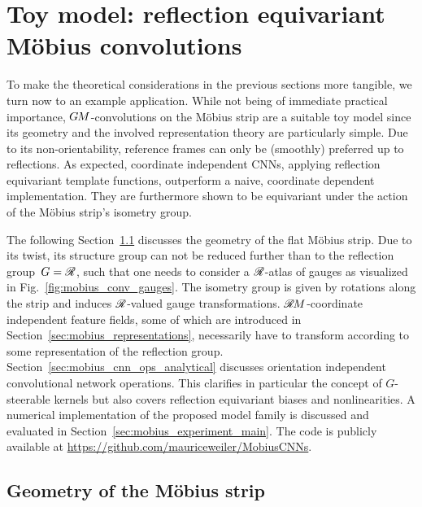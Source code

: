 

\section{Toy model: reflection equivariant M{\"o}bius convolutions}
\label{sec:mobius_conv}

To make the theoretical considerations in the previous sections more tangible, we turn now to an example application.
While not being of immediate practical importance, $G\mkern-1.4muM$-convolutions on the M\"obius strip are a suitable toy model since its geometry and the involved representation theory are particularly simple.
Due to its non-orientability, reference frames can only be (smoothly) preferred up to reflections.
As expected, coordinate independent CNNs, applying reflection equivariant template functions, outperform a naive, coordinate dependent implementation.
They are furthermore shown to be equivariant under the action of the M\"obius strip's isometry group.

\etocsettocstyle{}{} %
\localtableofcontents

The following Section~\ref{sec:mobius_geometry} discusses the geometry of the flat M\"obius strip.
Due to its twist, its structure group can not be reduced further than to the reflection group~$G=\mathscr{R}$, such that one needs to consider a $\mathscr{R}$-atlas of gauges as visualized in Fig.~\ref{fig:mobius_conv_gauges}.
The isometry group is given by rotations along the strip and induces $\mathscr{R}$-valued gauge transformations.
$\mathscr{R}\mkern-1.8muM$-coordinate independent feature fields, some of which are introduced in Section~\ref{sec:mobius_representations}, necessarily have to transform according to some representation of the reflection group.
Section~\ref{sec:mobius_cnn_ops_analytical} discusses orientation independent convolutional network operations.
This clarifies in particular the concept of $G$-steerable kernels but also covers reflection equivariant biases and nonlinearities.
A numerical implementation of the proposed model family is discussed and evaluated in Section~\ref{sec:mobius_experiment_main}.
The code is publicly available at \url{https://github.com/mauriceweiler/MobiusCNNs}.






\subsection{Geometry of the M\"obius strip}
\label{sec:mobius_geometry}

